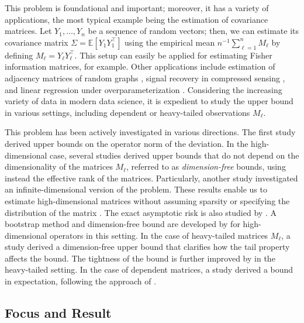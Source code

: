 \documentclass[11pt,a4paper]{article}
\theoremstyle{remark}
\theoremstyle{definition}
\theoremstyle{definition}
\newcommand{\Ep}{\mathbb{E}}
\newcommand{\rc}{\color{black}}
\begin{document}
\begin{bibunit}[apalike]
This problem is foundational and important; moreover, it has a variety of applications, the most typical example being the estimation of covariance matrices. 
Let $Y_1,\ldots ,Y_n$ be a sequence of random vectors; then, we can estimate its covariance matrix $\Sigma = \Ep[Y_1 Y_1^\top]$ using the empirical mean $n^{-1} \sum_{\ell = 1}^n M_\ell $ by defining $M_\ell = Y_\ell Y_\ell^\top$.
This setup can easily be applied for estimating Fisher information matrices, for example. 
Other applications include estimation of adjacency matrices of random graphs \citep{oliveira2009concentration}, signal recovery in compressed sensing \citep{donoho2006compressed}, and linear regression under overparameterization \citep{bartlett2020benign}.
Considering the increasing variety of data in modern data science, it is expedient to study the upper bound in various settings, including dependent or heavy-tailed observations $M_\ell$.

{\rc 
This problem has been actively investigated in various directions. 
The first study \citep{rudelson1999random} derived upper bounds on the operator norm of the deviation.
In the high-dimensional case, several studies
\citep{bunea2015sample,mendelson2014singular,srivastava2013covariance,koltchinskii2017concentration} derived upper bounds that do not depend on the dimensionality of the matrices $M_\ell$, referred to as \textit{dimension-free} bounds, using instead the effective rank of the matrices.
Particularly, another study \citep{giulini2018robust} investigated an infinite-dimensional version of the problem.
These results enable us to estimate high-dimensional matrices without assuming sparsity \citep{cai2010optimal} or specifying the distribution of the matrix \citep{adamczak2010quantitative,guedon2007lp,zhivotovskiy2021dimension}. 
The exact asymptotic risk is also studied by \citep{han2022exact}.
A bootstrap method and dimension-free bound are developed by \citep{lopes2023bootstrapping} for high-dimensional operators in this setting.
In the case of heavy-tailed matrices $M_\ell$, a study \citep{liaw2017simple} derived a dimension-free upper bound that clarifies how the tail property affects the bound.
The tightness of the bound is further improved by \citep{Vershynin2018High,jeong2022sub} in the heavy-tailed setting.
In the case of dependent matrices, a study \citep{han2020moment} derived a bound in expectation, following the approach of
\citep{handel2017structured}.
}

\subsection{Focus and Result}


\end{bibunit}
\end{document}
